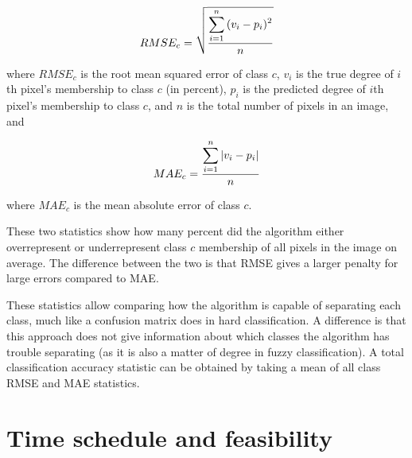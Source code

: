 \documentclass[a4paper,10pt]{article}
\begin{document}
$$ RMSE_c = \sqrt{ \displaystyle\sum_{i=1}^{n}{ (v_{i} - p_{i})^2 } \over{n} } $$

where $ RMSE_c $ is the root mean squared error of class $ c $, $ v_{i} $ is the true degree of $ i $th pixel's membership to class $ c $ (in percent), $ p_i $ is the predicted degree of $ i $th pixel's membership to class $ c $, and $ n $ is the total number of pixels in an image, and

$$ MAE_c = {\displaystyle\sum_{i=1}^{n}{ |v_{i} - p_{i}| } \over{n}} $$

where $ MAE_c $ is the mean absolute error of class $ c $.

These two statistics show how many percent did the algorithm either overrepresent or underrepresent class $ c $ membership of all pixels in the image on average. The difference between the two is that RMSE gives a larger penalty for large errors compared to MAE.

These statistics allow comparing how the algorithm is capable of separating each class, much like a confusion matrix does in hard classification. A difference is that this approach does not give information about which classes the algorithm has trouble separating (as it is also a matter of degree in fuzzy classification). A total classification accuracy statistic can be obtained by taking a mean of all class RMSE and MAE statistics.

\section{Time schedule and feasibility}


\end{document}
